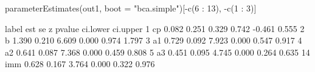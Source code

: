 \begin{Schunk}
\begin{Sinput}
 parameterEstimates(out1, 
                    boot = "bca.simple")[-c(6 : 13), -c(1 : 3)]
\end{Sinput}
\begin{Soutput}
   label   est    se     z pvalue ci.lower ci.upper
1     cp 0.082 0.251 0.329  0.742   -0.461    0.555
2      b 1.390 0.210 6.609  0.000    0.974    1.797
3     a1 0.729 0.092 7.923  0.000    0.547    0.917
4     a2 0.641 0.087 7.368  0.000    0.459    0.808
5     a3 0.451 0.095 4.745  0.000    0.264    0.635
14   imm 0.628 0.167 3.764  0.000    0.322    0.976
\end{Soutput}
\end{Schunk}
